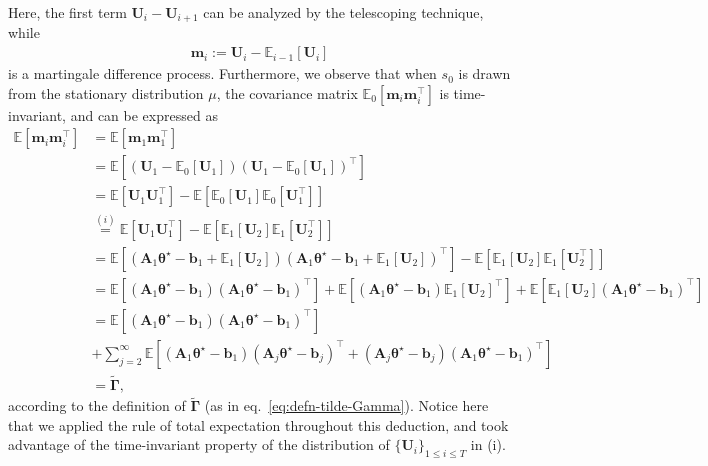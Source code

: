 Here, the first term $\bm{U}_i -\bm{U}_{i+1}$ can be analyzed by the telescoping technique, while 
\begin{align}\label{eq:defn-mi}
\bm{m}_i:= \bm{U}_{i} - \mathbb{E}_{i-1}[\bm{U}_{i}]
\end{align}
is a martingale difference process. Furthermore, we observe that when $s_0$ is drawn from the stationary distribution $\mu$, the covariance matrix $\mathbb{E}_{0}\left[\bm{m}_i \bm{m}_i^\top\right]$ is time-invariant, and can be expressed as
\begin{align}\label{eq:var-mi}
\mathbb{E}[\bm{m}_i \bm{m}_i^\top ] &= \mathbb{E}[\bm{m}_1 \bm{m}_1^\top]\nonumber \\ 
&= \mathbb{E}[(\bm{U}_1 - \mathbb{E}_0[\bm{U}_1])(\bm{U}_1 - \mathbb{E}_0[\bm{U}_1])^\top]\nonumber\\
&= \mathbb{E}[\bm{U}_1 \bm{U}_1^\top] - \mathbb{E}[\mathbb{E}_0[\bm{U}_1]\mathbb{E}_0[\bm{U}_1^\top]]\nonumber\\
&\overset{(i)}{=} \mathbb{E}[\bm{U}_1 \bm{U}_1^\top] - \mathbb{E}[\mathbb{E}_1[\bm{U}_2]\mathbb{E}_1[\bm{U}_2^\top]]\nonumber\\
&= \mathbb{E}[(\bm{A}_1 \bm{\theta}^\star -\bm{b}_1 + \mathbb{E}_1[\bm{U}_2])(\bm{A}_1 \bm{\theta}^\star -\bm{b}_1 + \mathbb{E}_1[\bm{U}_2])^\top] - \mathbb{E}[\mathbb{E}_1[\bm{U}_2]\mathbb{E}_1[\bm{U}_2^\top]]\nonumber\\
&= \mathbb{E}[(\bm{A}_1 \bm{\theta}^\star -\bm{b}_1)(\bm{A}_1 \bm{\theta}^\star -\bm{b}_1)^\top] + \mathbb{E}[(\bm{A}_1 \bm{\theta}^\star -\bm{b}_1)\mathbb{E}_1[\bm{U}_2]^\top] + \mathbb{E}[\mathbb{E}_1[\bm{U}_2](\bm{A}_1 \bm{\theta}^\star -\bm{b}_1)^\top]\nonumber\\
&= \mathbb{E}[(\bm{A}_1 \bm{\theta}^\star -\bm{b}_1)(\bm{A}_1 \bm{\theta}^\star -\bm{b}_1)^\top]\nonumber \\ 
&+ \sum_{j=2}^{\infty} \mathbb{E}[(\bm{A}_1 \bm{\theta}^\star -\bm{b}_1)(\bm{A}_j \bm{\theta}^\star - \bm{b}_j)^\top + (\bm{A}_j \bm{\theta}^\star - \bm{b}_j)(\bm{A}_1 \bm{\theta}^\star -\bm{b}_1)^\top]\nonumber\\
&= \widetilde{\bm{\Gamma}},
\end{align}
according to the definition of $\widetilde{\bm{\Gamma}}$ (as in eq.~\eqref{eq:defn-tilde-Gamma}). Notice here that we applied the rule of total expectation throughout this deduction, and took advantage of the time-invariant property of the distribution of $\{\bm{U}_i\}_{1 \leq i \leq T}$ in (i).

